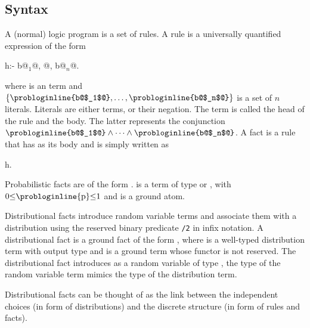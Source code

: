 \subsection{Syntax}
\begin{definition}
	A (normal) logic program is a set of rules. A rule is a universally quantified expression of the form
	\begin{problog}
h:- b@$_1$@, @\dots@, b@$_n$@.
	\end{problog}
	where  is an  term and $\{ \text{\probloginline{b@$_1$@}}, \text{\dots},\text{\probloginline{b@$_n$@}} \}$ is a set of $n$ literals.
	Literals are either  terms, or their negation.
	The  term  is called the head of the rule and  the body. The latter represents the
	conjunction $\text{\probloginline{b@$_1$@}} \land \cdots \land  \text{\probloginline{b@$_n$@}}$. A fact is a rule that has  as its body and is simply written as
	\begin{problog}
h.
	\end{problog}
\end{definition}




\begin{definition}
	Probabilistic facts are of the form .  is a term of type  or , with $0{\leq} \text{\probloginline{p}} {\leq} 1$  and  is a ground atom. 
\end{definition}


\begin{definition}
	Distributional facts introduce random variable terms and associate them with a distribution using the reserved binary predicate \probloginline{~}\lstinline[columns=fixed]|/2| in infix notation. A distributional fact is a ground fact of the form , where  is a well-typed distribution term with output type  and  is a ground term whose functor is not reserved. The distributional fact introduces  as a random variable of type , \ie the type of the random variable term mimics the type of the distribution term.
\end{definition}
Distributional facts can be thought of as the link between the independent choices (in form of distributions) and the discrete structure (in form of rules and facts).

